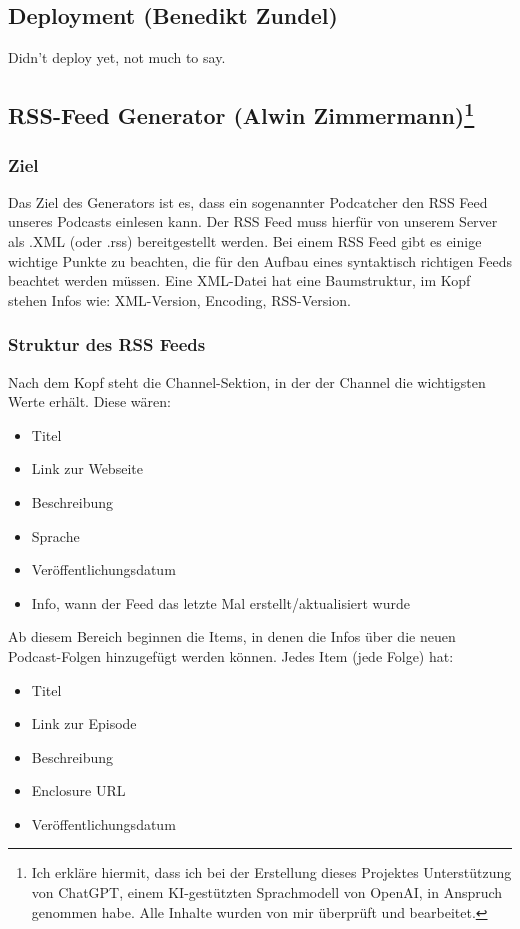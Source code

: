 \documentclass{article}
\begin{document}
\subsection{Deployment \small{(Benedikt Zundel)}}
Didn't deploy yet, not much to say.

\subsection[RSS-Feed Generator \small{(Alwin Zimmermann)}]{RSS-Feed Generator \small{(Alwin Zimmermann)\footnote{Ich erkläre hiermit, dass ich bei der Erstellung dieses Projektes Unterstützung von ChatGPT, einem KI-gestützten Sprachmodell von OpenAI, in Anspruch genommen habe. Alle Inhalte wurden von mir überprüft und bearbeitet.}}}

\subsubsection{Ziel}
Das Ziel des Generators ist es, dass ein sogenannter Podcatcher den RSS Feed unseres Podcasts einlesen kann. Der RSS Feed muss hierfür von unserem Server als .XML (oder .rss) bereitgestellt werden. Bei einem RSS Feed gibt es einige wichtige Punkte zu beachten, die für den Aufbau eines syntaktisch richtigen Feeds beachtet werden müssen. Eine XML-Datei hat eine Baumstruktur, im Kopf stehen Infos wie: XML-Version, Encoding, RSS-Version.

\subsubsection{Struktur des RSS Feeds}
Nach dem Kopf steht die Channel-Sektion, in der der Channel die wichtigsten Werte erhält. Diese wären:
\begin{itemize}
    \item Titel
    \item Link zur Webseite
    \item Beschreibung
    \item Sprache
    \item Veröffentlichungsdatum
    \item Info, wann der Feed das letzte Mal erstellt/aktualisiert wurde
\end{itemize}

Ab diesem Bereich beginnen die Items, in denen die Infos über die neuen Podcast-Folgen hinzugefügt werden können. Jedes Item (jede Folge) hat:

\begin{itemize}
    \item Titel
    \item Link zur Episode
    \item Beschreibung
    \item Enclosure URL
    \item Veröffentlichungsdatum
\end{itemize}
\end{document}
